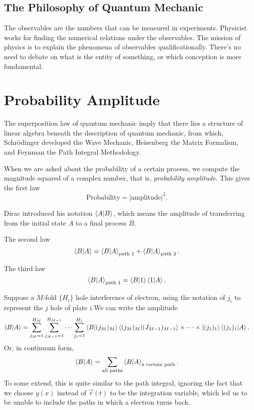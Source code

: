 \section[量子力学的哲学]{The Philosophy of Quantum Mechanic}
The observables are the numbers that can be measured in experiments. Physicist works for finding the numerical relations under the observables. The mission of physics is to explain the phenomena of observables qualificationally. 
There's no need to debate on what is the entity of something, or which conception is more fundamental.

\chapter[概率幅]{Probability Amplitude}
The superposition law of quantum mechanic imply that there lies a structure of linear algebra beneath the description of quantum mechanic, from which, Schr\"odinger developed the Wave Mechanic, Heisenberg the Matrix Formalism, and Feynman the Path Integral Methodology.

When we are asked about the probability of a certain process, we compute the magnitude squared of a complex number, that is, \textit{probability amplitude}. This gives the first law
\begin{equation}
  \text{Probability} = |\text{amplitude}|^2.
\end{equation}

Dirac introduced his notation $\bra{A}\ket{B}$, which means the amplitude of transferring from the initial state $A$ to a final process $B$.

The second law
\begin{equation}
  \bra{B}\ket{A} = \bra{B}\ket{A}_{\text{path 1}} + \bra{B}\ket{A}_{\text{path 2}}.
\end{equation}

The third law
\begin{equation}
    \bra{B}\ket{A}_{\text{path 1}} = \bra{B}\ket{1} \bra{1}\ket{A}.
\end{equation}

Suppose a $M$-fold $\{H_i\}$ hole interference of electron, using the notation of $j_{i}$ to represent the $j$ hole of plate $i$.We can write the amplitude
\begin{equation}
  \bra{B}\ket{A} = \sum_{j_M = 1}^{H_M} \sum_{j_{M-1} = 1}^{H_{M-1}}\cdots \sum_{j_1 = 1}^{H_1} \bra{B} \ket{(j_M)_M}\bra{(j_M)_M} \ket{(J_{M-1})_{M-1}} \times \cdots \times 
  \ket{(j_1)_1}\bra{(j_1)_1} \ket{A}  .
\end{equation}
Or, in continuum form, 
\begin{equation}
  \bra{B}\ket{A} = \sum_{\text{all paths}} \bra{B}\ket{A}_{\text{a certain path}}.
\end{equation}
To some extend, this is quite similar to the path integral, ignoring the fact that we choose $y(x)$ instead of $\vec{r}(t)$ to be the integration variable, which led us to be unable to include the paths in which a electron turns back.

